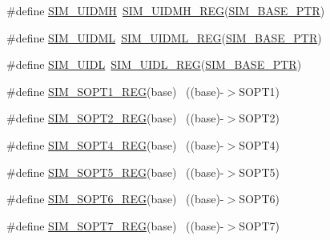 \begin{DoxyCompactItemize}
\#define \hyperlink{group___s_i_m___register___accessor___macros_ga249d788e4d47b27bc148724e45a3f220}{S\+I\+M\+\_\+\+U\+I\+D\+MH}~\hyperlink{group___s_i_m___register___accessor___macros_gaffd69cc3f48c0e204d8c659424b4c51d}{S\+I\+M\+\_\+\+U\+I\+D\+M\+H\+\_\+\+R\+EG}(\hyperlink{group___s_i_m___peripheral_ga719ec5df95fbb5732438f794f2cccf3c}{S\+I\+M\+\_\+\+B\+A\+S\+E\+\_\+\+P\+TR})
\item 
\#define \hyperlink{group___s_i_m___register___accessor___macros_gafcfbcc294236ebd497bbc60dc8b7989b}{S\+I\+M\+\_\+\+U\+I\+D\+ML}~\hyperlink{group___s_i_m___register___accessor___macros_gaac80320f7e56ccd1cd6b54cfdc322430}{S\+I\+M\+\_\+\+U\+I\+D\+M\+L\+\_\+\+R\+EG}(\hyperlink{group___s_i_m___peripheral_ga719ec5df95fbb5732438f794f2cccf3c}{S\+I\+M\+\_\+\+B\+A\+S\+E\+\_\+\+P\+TR})
\item 
\#define \hyperlink{group___s_i_m___register___accessor___macros_ga70ca9df0243083e9ba6b7b037beaa69d}{S\+I\+M\+\_\+\+U\+I\+DL}~\hyperlink{group___s_i_m___register___accessor___macros_ga50225b2615456e0a763efbe4ec59b077}{S\+I\+M\+\_\+\+U\+I\+D\+L\+\_\+\+R\+EG}(\hyperlink{group___s_i_m___peripheral_ga719ec5df95fbb5732438f794f2cccf3c}{S\+I\+M\+\_\+\+B\+A\+S\+E\+\_\+\+P\+TR})
\item 
\#define \hyperlink{group___s_i_m___register___accessor___macros_ga4fb13e9e7e8bf019daf19284be9b0a73}{S\+I\+M\+\_\+\+S\+O\+P\+T1\+\_\+\+R\+EG}(base)                                        ~((base)-\/$>$S\+O\+P\+T1)
\item 
\#define \hyperlink{group___s_i_m___register___accessor___macros_ga94d1a56cbf8d6fbebbd00363ce3cd130}{S\+I\+M\+\_\+\+S\+O\+P\+T2\+\_\+\+R\+EG}(base)                                        ~((base)-\/$>$S\+O\+P\+T2)
\item 
\#define \hyperlink{group___s_i_m___register___accessor___macros_gae47c458103d1381ff7b7f25e45338a64}{S\+I\+M\+\_\+\+S\+O\+P\+T4\+\_\+\+R\+EG}(base)                                        ~((base)-\/$>$S\+O\+P\+T4)
\item 
\#define \hyperlink{group___s_i_m___register___accessor___macros_ga969ab1c02ed173435da69034770b467e}{S\+I\+M\+\_\+\+S\+O\+P\+T5\+\_\+\+R\+EG}(base)                                        ~((base)-\/$>$S\+O\+P\+T5)
\item 
\#define \hyperlink{group___s_i_m___register___accessor___macros_ga85d55fa9e68aed99023ba7331fb30a8d}{S\+I\+M\+\_\+\+S\+O\+P\+T6\+\_\+\+R\+EG}(base)                                        ~((base)-\/$>$S\+O\+P\+T6)
\item 
\#define \hyperlink{group___s_i_m___register___accessor___macros_gadd45a86c03d150e9641a354840a71443}{S\+I\+M\+\_\+\+S\+O\+P\+T7\+\_\+\+R\+EG}(base)                                        ~((base)-\/$>$S\+O\+P\+T7)

\end{DoxyCompactItemize}
